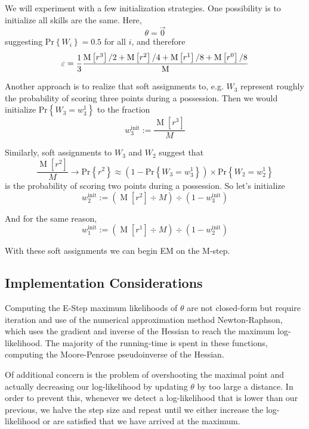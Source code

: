 \documentclass[10pt,twocolumn]{article}
\newcommand{\prb}[1]{\ensuremath{  \mathrm{Pr}\left\{ #1 \right\}  }}
\begin{document}
We will experiment with a few initialization strategies.
One possibility is to initialize all skills are the same.
Here,
\[
\theta = \vec 0
\]%
suggesting $\prb{W_i} = 0.5$ for all $i$, and therefore
\[
\varepsilon = {1 \over 3} \frac{ \operatorname{M}\left[ r^3 \right]/2 + \operatorname{M}\left[ r^2 \right]/4 + \operatorname{M}\left[ r^1 \right]/8 + \operatorname{M}\left[ r^0 \right]/8 }{\operatorname{M}}
\]%

Another approach is to realize that soft assignments to, e.g. $W_3$ represent roughly the probability of scoring three points during a possession.
Then
we would initialize $\prb{W_3 = w_3^1}$ to the fraction
\[
w_3^{\mathrm{init}} := \frac{ \operatorname{M}\left[ r^3 \right] }{ M } 
\]%

Similarly, soft assignments to $W_3$ and $W_2$ suggest that
\[
\frac{ \operatorname{M}\left[ r^2 \right] }{ M } \to \prb{r^2} \approx \left(1 - \prb{W_3 = w_3^1}\right) \times \prb{W_2 = w_2^1}
\]%
is the probability of scoring two points during a possession. So let's initialize
\[
w_2^{\mathrm{init}} := \left( \operatorname{M}\left[ r^2 \right] \div  M \right) \div \left( 1 - w_3^{\mathrm{init}} \right) 
\]%

And for the same reason,
\[
w_1^{\mathrm{init}} := \left( \operatorname{M}\left[ r^1 \right] \div  M \right) \div \left( 1 - w_2^{\mathrm{init}} \right) 
\]%

With these soft assignments we can begin EM on the M-step.


\subsection{Implementation Considerations}

Computing the E-Step maximum likelihoods of $\theta$ are not closed-form but require iteration and use of the numerical approximation method Newton-Raphson, which uses the gradient and inverse of the Hessian to reach the maximum log-likelihood. The majority of the running-time is spent in these functions, computing the Moore-Penrose pseudoinverse of the Hessian.

Of additional concern is the problem of overshooting the maximal point and actually decreasing our log-likelihood by updating $\theta$ by too large a distance. In order to prevent this, whenever we detect a log-likelihood that is lower than our previous, we halve the step size and repeat until we either increase the log-likelihood or are satisfied that we have arrived at the maximum.
\end{document}
